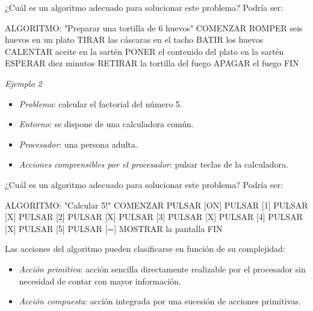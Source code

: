 \documentclass[
]{book}
\newenvironment{Shaded}{\begin{snugshade}}{\end{snugshade}}
\newcommand{\NormalTok}[1]{#1}
\providecommand{\tightlist}{%
  \setlength{\itemsep}{0pt}\setlength{\parskip}{0pt}}
\begin{document}
¿Cuál es un algoritmo adecuado para solucionar este problema? Podría ser:

\begin{Shaded}
\begin{Highlighting}[]
\NormalTok{ALGORITMO: "Preparar una tortilla de 6 huevos"}
\NormalTok{COMENZAR}
\NormalTok{    ROMPER seis huevos en un plato}
\NormalTok{    TIRAR las cáscaras en el tacho}
\NormalTok{    BATIR los huevos}
\NormalTok{    CALENTAR aceite en la sartén}
\NormalTok{    PONER el contenido del plato en la sartén}
\NormalTok{    ESPERAR diez minutos}
\NormalTok{    RETIRAR la tortilla del fuego}
\NormalTok{    APAGAR el fuego}
\NormalTok{FIN}
\end{Highlighting}
\end{Shaded}

\emph{Ejemplo 2}

\begin{itemize}
\tightlist
\item
  \emph{Problema}: calcular el factorial del número 5.
\item
  \emph{Entorno}: se dispone de una calculadora común.
\item
  \emph{Procesador}: una persona adulta.
\item
  \emph{Acciones comprensibles por el procesador}: pulsar teclas de la calculadora.
\end{itemize}

¿Cuál es un algoritmo adecuado para solucionar este problema? Podría ser:

\begin{Shaded}
\begin{Highlighting}[]
\NormalTok{ALGORITMO: "Calcular 5!"}
\NormalTok{COMENZAR}
\NormalTok{    PULSAR [ON]}
\NormalTok{    PULSAR [1]}
\NormalTok{    PULSAR [X]}
\NormalTok{    PULSAR [2]}
\NormalTok{    PULSAR [X]}
\NormalTok{    PULSAR [3]}
\NormalTok{    PULSAR [X]}
\NormalTok{    PULSAR [4]}
\NormalTok{    PULSAR [X]}
\NormalTok{    PULSAR [5]}
\NormalTok{    PULSAR [=]}
\NormalTok{    MOSTRAR la pantalla}
\NormalTok{FIN}
\end{Highlighting}
\end{Shaded}

Las acciones del algoritmo pueden clasificarse en función de su complejidad:

\begin{itemize}
\tightlist
\item
  \emph{Acción primitiva}: acción sencilla directamente realizable por el procesador sin necesidad de contar con mayor información.
\item
  \emph{Acción compuesta}: acción integrada por una sucesión de acciones primitivas.
\end{itemize}
\end{document}
